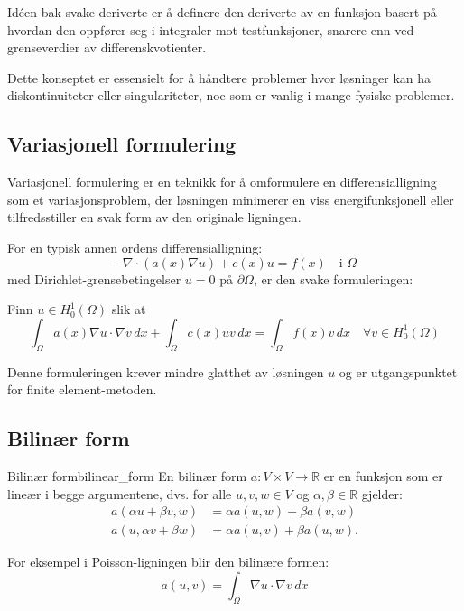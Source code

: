 Idéen bak svake deriverte er å definere den deriverte av en funksjon basert på hvordan den oppfører seg i integraler mot testfunksjoner, snarere enn ved grenseverdier av differenskvotienter.

Dette konseptet er essensielt for å håndtere problemer hvor løsninger kan ha diskontinuiteter eller singulariteter, noe som er vanlig i mange fysiske problemer.

\subsection{Variasjonell formulering}
Variasjonell formulering er en teknikk for å omformulere en differensialligning som et variasjonsproblem, der løsningen minimerer en viss energifunksjonell eller tilfredsstiller en svak form av den originale ligningen.

For en typisk annen ordens differensialligning:
\begin{equation}
	-\nabla \cdot (a(x) \nabla u) + c(x)u = f(x) \quad \text{i } \Omega
\end{equation}
med Dirichlet-grensebetingelser $u = 0$ på $\partial\Omega$, er den svake formuleringen:

Finn $u \in H^1_0(\Omega)$ slik at
\begin{equation}
	\int_\Omega a(x) \nabla u \cdot \nabla v \, dx + \int_\Omega c(x) u v \, dx = \int_\Omega f(x) v \, dx \quad \forall v \in H^1_0(\Omega)
\end{equation}

Denne formuleringen krever mindre glatthet av løsningen $u$ og er utgangspunktet for finite element-metoden.

\subsection{Bilinær form}
\begin{definition}{Bilinær form}{bilinear_form}
	En bilinær form $a: V \times V \to \mathbb{R}$ er en funksjon som er lineær i begge argumentene, dvs. for alle $u,v,w \in V$ og $\alpha, \beta \in \mathbb{R}$ gjelder:
	\begin{align*}
		a(\alpha u + \beta v, w) & = \alpha a(u,w) + \beta a(v,w)  \\
		a(u, \alpha v + \beta w) & = \alpha a(u,v) + \beta a(u,w).
	\end{align*}
\end{definition}

For eksempel i Poisson-ligningen blir den bilinære formen:
\begin{equation}
	a(u,v) = \int_\Omega \nabla u \cdot \nabla v \, dx
\end{equation}

